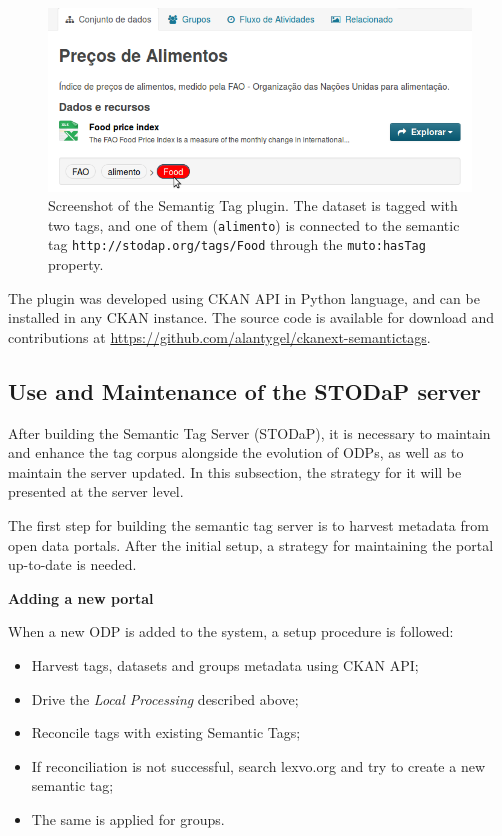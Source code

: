 \begin{figure}[ht]
\begin{center}
\includegraphics[width=\columnwidth]{images/local_link.png}
\caption[Screenshot of the Semantig Tag plugin.]{Screenshot of the Semantig Tag plugin. The dataset is tagged with two tags, and one of them (\texttt{alimento}) is connected to the semantic tag \texttt{http://stodap.org/tags/Food} through the \texttt{muto:hasTag} property.}
\label{fig:local_link}
\end{center}
\end{figure}

The plugin was developed using CKAN API in Python language, and can be installed in any CKAN instance. The source code is available for download and contributions at \url{https://github.com/alantygel/ckanext-semantictags}.

\subsection{Use and Maintenance of the STODaP server}
\label{sec:use_and_maintenance}

After building the Semantic Tag Server (STODaP), it is necessary to maintain and enhance the tag corpus alongside the evolution of ODPs, as well as to maintain the server updated.
In this subsection, the strategy for it will be presented at the server level.

The first step for building the semantic tag server is to harvest metadata from open data portals.
After the initial setup, a strategy for maintaining the portal up-to-date is needed.

\noindent \textbf{Adding a new portal}

When a new ODP is added to the system, a setup procedure is followed:
\begin{itemize}
	\item Harvest tags, datasets and groups metadata using CKAN API;
	\item Drive the \emph{Local Processing} described above;
	\item Reconcile tags with existing Semantic Tags;
	\item If reconciliation is not successful, search lexvo.org and try to create a new semantic tag;
	\item The same is applied for groups.
\end{itemize}

